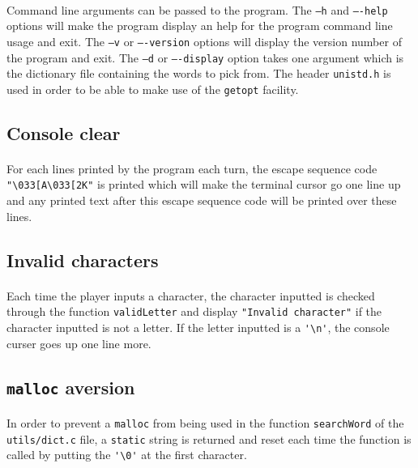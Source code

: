 \documentclass{report}
\begin{document}
\paragraph{} Command line arguments can be passed to the program. The
\texttt{--h} and \texttt{----help} options will make the program display an
help for the program command line usage and exit. The \texttt{--v} or
\texttt{----version} options will display the version number of the program and
exit. The \texttt{--d} or \texttt{----display} option takes one argument which
is the dictionary file containing the words to pick from. The header
\texttt{unistd.h} is used in order to be able to make use of the
\texttt{getopt} facility.

\subsection{Console clear}

\paragraph{} For each lines printed by the program each turn, the escape
sequence code \lstinline[style=prog]|"\033[A\033[2K"| is printed which will
	make the terminal cursor go one line up and any printed text after this
	escape sequence code will be printed over these lines.

\subsection{Invalid characters}

\paragraph{} Each time the player inputs a character, the character inputted is
checked through the function \lstinline[style=prog]|validLetter| and display
\lstinline[style=prog]|"Invalid character"| if the character inputted is not a
letter.  If the letter inputted is a \lstinline[style=prog]|'\n'|, the console
curser goes up one line more.

\subsection{\texttt{malloc} aversion}

\paragraph{} In order to prevent a \lstinline[style=prog]|malloc| from being
used in the function \lstinline[style=prog]|searchWord| of the
\texttt{utils/dict.c} file, a \lstinline[style=prog]|static| string is returned
and reset each time the function is called by putting the
\lstinline[style=prog]|'\0'| at the first character.
\end{document}
